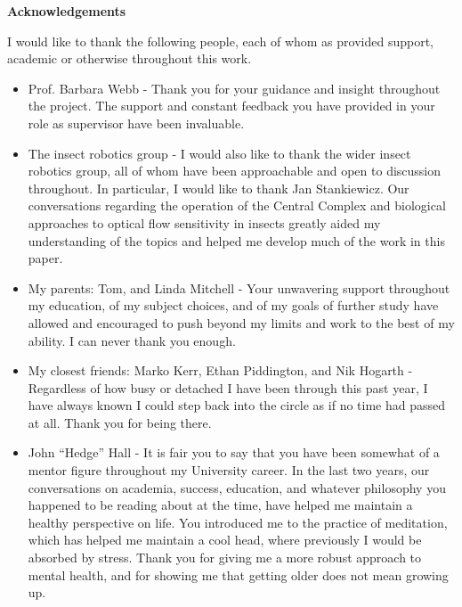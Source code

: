 \documentclass[a4paper,11pt,twoside,openright]{article}
\begin{document}
\centering
{\LARGE \textbf{Acknowledgements}}
\begin{flushleft}
  {\small I would like to thank the following people, each of whom as
    provided support, academic or otherwise throughout this work.

    \begin{itemize}
    \item{Prof. Barbara Webb - Thank you for your guidance and insight
      throughout the project. The support and constant feedback you
      have provided in your role as supervisor have been invaluable.}

    \item{The insect robotics group - I would also like to thank the
      wider insect robotics group, all of whom have been approachable
      and open to discussion throughout. In particular, I would like
      to thank Jan Stankiewicz. Our conversations regarding the
      operation of the Central Complex and biological approaches to
      optical flow sensitivity in insects greatly aided my
      understanding of the topics and helped me develop much of the
      work in this paper. }

    \item{My parents: Tom, and Linda Mitchell - Your unwavering
      support throughout my education, of my subject
      choices, and of my goals of further study have allowed and
      encouraged to push beyond my limits and work to the best of my
      ability. I can never thank you enough.
        }

    \item{My closest friends: Marko Kerr, Ethan Piddington, and Nik
      Hogarth - Regardless of how busy or detached I have been through
      this past year, I have always known I could step back into the
      circle as if no time had passed at all. Thank you for being
      there. }

    \item{John ``Hedge'' Hall - It is fair you to say that you have
      been somewhat of a mentor figure throughout my University
      career. In the last two years, our conversations on academia,
      success, education, and whatever philosophy you happened to be
      reading about at the time, have helped me maintain a healthy
      perspective on life. You introduced me to the practice of
      meditation, which has helped me maintain a cool head, where
      previously I would be absorbed by stress. Thank you for giving
      me a more robust approach to mental health, and for showing me
      that getting older does not mean growing up.}


\end{itemize}}
\end{flushleft}
\end{document}
